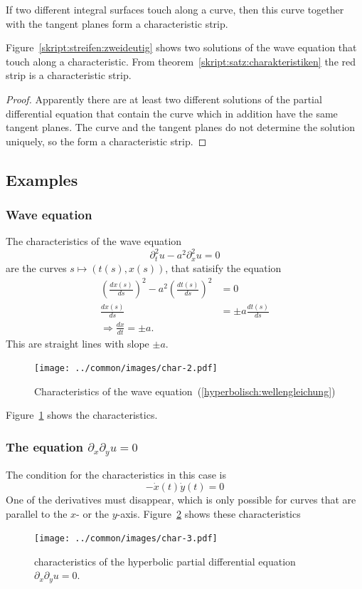 \begin{satz}
\label{skript:satz:charakteristiken}
If two different integral surfaces touch along a curve,
then this curve together with the tangent planes form a characteristic strip.
\end{satz}

Figure~\ref{skript:streifen:zweideutig} shows two solutions of the wave
equation that touch along a characteristic.
From theorem~\ref{skript:satz:charakteristiken} the red strip is a 
characteristic strip.

\begin{proof}
Apparently there are at least two different solutions of the
partial differential equation that contain the curve which in
addition have the same tangent planes.
The curve and the tangent planes do not determine the solution
uniquely, so the form a characteristic strip.
\end{proof}

\subsection{Examples}
\subsubsection{Wave equation}
The characteristics of the wave equation
\begin{equation}
\partial_t^2u-a^2\partial_x^2u=0
\label{hyperbolisch:wellengleichung}
\end{equation}
are the curves $s\mapsto(t(s),x(s))$, that satisify the equation
\begin{align*}
\left(
\frac{dx(s)}{ds}\right)^2-a^2\left(\frac{dt(s)}{ds}\right)^2&=0
\\
\frac{dx(s)}{ds}
&=
\pm a\frac{dt(s)}{ds}
\\
\Rightarrow
\frac{dx}{dt}=\pm a.
\end{align*}
This are straight lines with slope $\pm a$.
\begin{figure}
\begin{center}
\texttt{[image: ../common/images/char-2.pdf]}
\end{center}
\caption{Characteristics of the wave
equation~(\ref{hyperbolisch:wellengleichung})
\label{hyp:wellen}}
\end{figure}
Figure~\ref{hyp:wellen} shows the characteristics.

\subsubsection{The equation $\partial_x\partial_yu=0$}
The condition for the characteristics in this case is
\[
-\dot x(t)\dot y(t)=0
\]
One of the derivatives must disappear, which is only possible for
curves that are parallel to the $x$- or the $y$-axis.
Figure~\ref{hyp:dxdy} shows these characteristics
\begin{figure}
\begin{center}
\texttt{[image: ../common/images/char-3.pdf]}
\end{center}
\caption{characteristics of the hyperbolic partial differential equation
$\partial_x\partial_yu=0$.
\label{hyp:dxdy}}
\end{figure}

